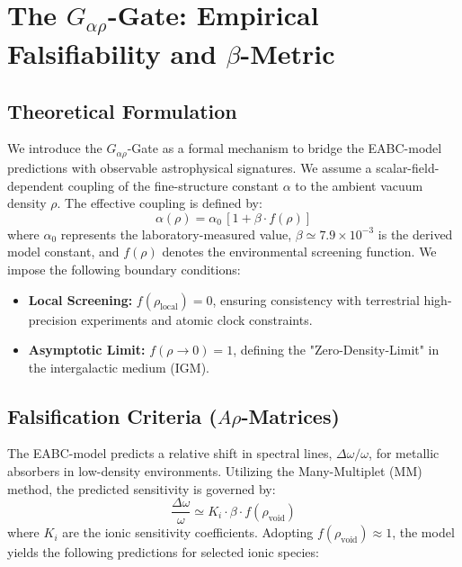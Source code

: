 
\section{The $G_{\alpha\rho}$-Gate: Empirical Falsifiability and $\beta$-Metric}

\subsection{Theoretical Formulation}
We introduce the $G_{\alpha\rho}$-Gate as a formal mechanism to bridge the EABC-model predictions with observable astrophysical signatures. We assume a scalar-field-dependent coupling of the fine-structure constant $\alpha$ to the ambient vacuum density $\rho$. The effective coupling is defined by:
\begin{equation}
    \alpha(\rho) = \alpha_0 \, [1 + \beta \cdot f(\rho)]
\end{equation}
where $\alpha_0$ represents the laboratory-measured value, $\beta \simeq 7.9 \times 10^{-3}$ is the derived model constant, and $f(\rho)$ denotes the environmental screening function. We impose the following boundary conditions:
\begin{itemize}
    \item \textbf{Local Screening:} $f(\rho_{\text{local}}) = 0$, ensuring consistency with terrestrial high-precision experiments and atomic clock constraints.
    \item \textbf{Asymptotic Limit:} $f(\rho \to 0) = 1$, defining the "Zero-Density-Limit" in the intergalactic medium (IGM).
\end{itemize}

\subsection{Falsification Criteria ($A\rho$-Matrices)}
The EABC-model predicts a relative shift in spectral lines, $\Delta \omega / \omega$, for metallic absorbers in low-density environments. Utilizing the Many-Multiplet (MM) method, the predicted sensitivity is governed by:
\begin{equation}
    \frac{\Delta \omega}{\omega} \simeq K_i \cdot \beta \cdot f(\rho_{\text{void}})
\end{equation}
where $K_i$ are the ionic sensitivity coefficients. Adopting $f(\rho_{\text{void}}) \approx 1$, the model yields the following predictions for selected ionic species:

